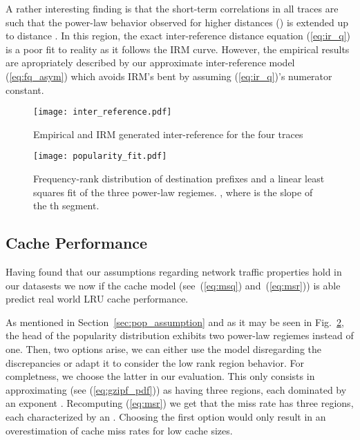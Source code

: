 \documentclass[twocolumn, 10pt]{article}
\theoremstyle{plain}
\begin{document}
A rather interesting finding is that the short-term correlations in all traces
are such that the power-law behavior observed for higher distances () is extended
up to distance . In this region, the exact inter-reference distance
equation (\ref{eq:ir_q}) is a poor fit to reality as it follows
the IRM curve. However, the empirical results are apropriately described by our
approximate inter-reference model (\ref{eq:fq_asym}) which avoids IRM's bent by assuming
(\ref{eq:ir_q})'s numerator constant. 

\begin{figure}[t]
    \centering
    \texttt{[image: inter\_reference.pdf]}
    \caption{Empirical and IRM generated inter-reference for the four traces}
    \label{fig:ir_comparison}
\end{figure}

\begin{figure}[t]
    \centering
    \texttt{[image: popularity\_fit.pdf]}
    \caption{Frequency-rank distribution of destination prefixes and a
    linear least squares fit of the three power-law regiemes.
    , where  is the slope of the th segment.}
    \label{fig:pop_fit}
\end{figure}

\subsection{Cache Performance}\label{sec:cache_res}

Having found that our assumptions regarding network traffic properties hold in
our datasests we now if the cache model (see~(\ref{eq:msq})
and~(\ref{eq:msr})) is able predict real world LRU cache performance. 

As mentioned in Section~\ref{sec:pop_assumption} and as it may be seen in
Fig.~\ref{fig:pop_fit}, the head of the popularity distribution exhibits two
power-law regiemes instead of one. Then, two options arise, we can either use
the model disregarding the discrepancies or adapt it to consider the low rank
region behavior. For completness, we choose the latter in our evaluation. This
only consists in approximating  (see (\ref{eq:gzipf_pdf})) as
having three regions, each dominated by an exponent . Recomputing
(\ref{eq:msr}) we get that the miss rate has three regions, each
characterized by an . Choosing the first option would only
result in an overestimation of cache miss rates for low cache sizes.
\end{document}
